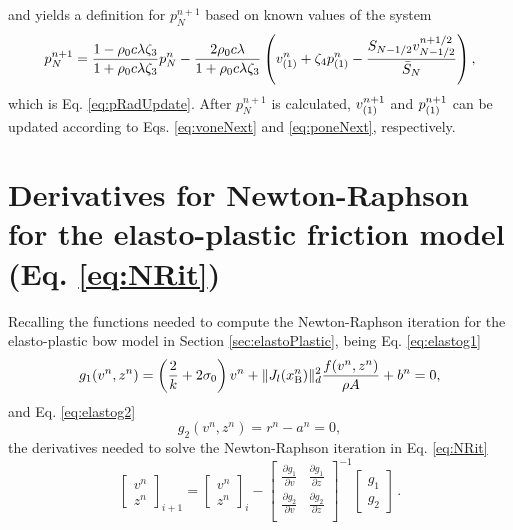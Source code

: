 and yields a definition for $p_N^{n+1}$ based on known values of the system
\begin{equation}\label{eq:pradApp}
    p_N^{n+1} = \frac{1 - \rho_0c\lambda\zeta_3}{1+\rho_0c\lambda\zeta_3}p_N^n - \frac{2\rho_0c\lambda}{1+\rho_0c\lambda\zeta_3} \left( v_{(1)}^n+\zeta_4p_{(1)}^n - \frac{S_{N-1/2}v_{N-1/2}^{n+1/2}}{\bar S_N}\right),
\end{equation}
which is Eq. \eqref{eq:pRadUpdate}. After $p_N^{n+1}$ is calculated, $v_{(1)}^{n+1}$ and $p_{(1)}^{n+1}$ can be updated according to Eqs. \eqref{eq:voneNext} and \eqref{eq:poneNext}, respectively.

\section{Derivatives for Newton-Raphson for the elasto-plastic friction model (Eq. \eqref{eq:NRit})}\label{app:elastoDeriv}
Recalling the functions needed to compute the Newton-Raphson iteration for the elasto-plastic bow model in Section \ref{sec:elastoPlastic}, being Eq. \eqref{eq:elastog1}
\begin{equation*}
    g_1(v^n,z^n) = \left(\frac{2}{k} + 2\sigma_{0}\right)v^n + \lVert J_l(x_{\text{B}}^n)\rVert_d^2\frac{f(v^n,z^n)}{\rho A}+ b^n= 0,
\end{equation*}
and Eq. \eqref{eq:elastog2}
\begin{equation*}
    g_2(v^n, z^n) = r^n - a^n = 0,
\end{equation*}
the derivatives needed to solve the Newton-Raphson iteration in Eq. \eqref{eq:NRit} 
\begin{equation*}
    \begin{bmatrix}
        v^n\\
        z^n
        \end{bmatrix}_{i+1}
        =
        \begin{bmatrix}
        v^n\\
        z^n
        \end{bmatrix}_i
        -
        \begin{bmatrix}
        \frac{\partial g_1}{\partial v} & \frac{\partial g_1}{\partial z}\\
        \frac{\partial g_2}{\partial v} & \frac{\partial g_2}{\partial z}\\
        \end{bmatrix}^{-1}
        \begin{bmatrix}
        g_1\\
        g_2
        \end{bmatrix}\,
        .
\end{equation*}

